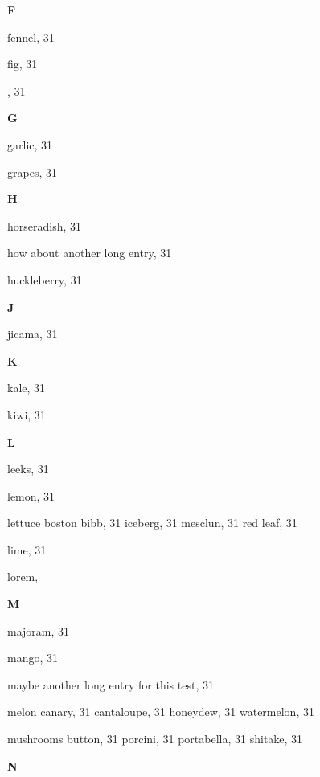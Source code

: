 \begin{theindex}
  \indexspace
{\sffamily\bfseries{F}}\nopagebreak

  \item fennel, 31
  \item fig, 31
  \item {}, 31

  \indexspace
{\sffamily\bfseries{G}}\nopagebreak

  \item garlic, 31
  \item grapes, 31

  \indexspace
{\sffamily\bfseries{H}}\nopagebreak

  \item horseradish, 31
  \item how about another long entry, 31
  \item huckleberry, 31

  \indexspace
{\sffamily\bfseries{J}}\nopagebreak

  \item jicama, 31

  \indexspace
{\sffamily\bfseries{K}}\nopagebreak

  \item kale, 31
  \item kiwi, 31

  \indexspace
{\sffamily\bfseries{L}}\nopagebreak

  \item leeks, 31
  \item lemon, 31
  \item lettuce
    \subitem boston bibb, 31
    \subitem iceberg, 31
    \subitem mesclun, 31
    \subitem red leaf, 31
  \item lime, 31
  \item lorem, 

  \indexspace
{\sffamily\bfseries{M}}\nopagebreak

  \item majoram, 31
  \item mango, 31
  \item maybe another long entry for this test, 31
  \item melon
    \subitem canary, 31
    \subitem cantaloupe, 31
    \subitem honeydew, 31
    \subitem watermelon, 31
  \item mushrooms
    \subitem button, 31
    \subitem porcini, 31
    \subitem portabella, 31
    \subitem shitake, 31

  \indexspace
{\sffamily\bfseries{N}}\nopagebreak


\end{theindex}
